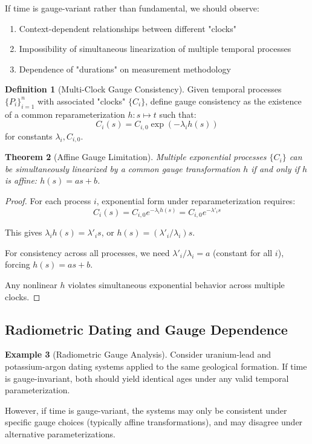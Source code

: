 \documentclass[11pt]{article}
\theoremstyle{definition}
\newtheorem{definition}{Definition}[section]
\newtheorem{example}[definition]{Example}
\theoremstyle{plain}
\newtheorem{theorem}[definition]{Theorem}
\theoremstyle{remark}
\begin{document}
\begin{keypoint}
If time is gauge-variant rather than fundamental, we should observe:
\begin{enumerate}
\item Context-dependent relationships between different "clocks"
\item Impossibility of simultaneous linearization of multiple temporal processes
\item Dependence of "durations" on measurement methodology
\end{enumerate}
\end{keypoint}

\begin{definition}[Multi-Clock Gauge Consistency]
Given temporal processes $\{P_i\}_{i=1}^n$ with associated "clocks" $\{C_i\}$, define gauge consistency as the existence of a common reparameterization $h: s \mapsto t$ such that:
$$C_i(s) = C_{i,0} \exp(-\lambda_i h(s))$$
for constants $\lambda_i, C_{i,0}$.
\end{definition}

\begin{theorem}[Affine Gauge Limitation]
Multiple exponential processes $\{C_i\}$ can be simultaneously linearized by a common gauge transformation $h$ if and only if $h$ is affine: $h(s) = as + b$.
\end{theorem}

\begin{proof}
For each process $i$, exponential form under reparameterization requires:
$$C_i(s) = C_{i,0} e^{-\lambda_i h(s)} = C_{i,0} e^{-\lambda'_i s}$$

This gives $\lambda_i h(s) = \lambda'_i s$, or $h(s) = (\lambda'_i/\lambda_i) s$.

For consistency across all processes, we need $\lambda'_i/\lambda_i = a$ (constant for all $i$), forcing $h(s) = as + b$.

Any nonlinear $h$ violates simultaneous exponential behavior across multiple clocks.
\end{proof}

\subsection{Radiometric Dating and Gauge Dependence}

\begin{example}[Radiometric Gauge Analysis]
Consider uranium-lead and potassium-argon dating systems applied to the same geological formation. If time is gauge-invariant, both should yield identical ages under any valid temporal parameterization.

However, if time is gauge-variant, the systems may only be consistent under specific gauge choices (typically affine transformations), and may disagree under alternative parameterizations.
\end{example}
\end{document}
